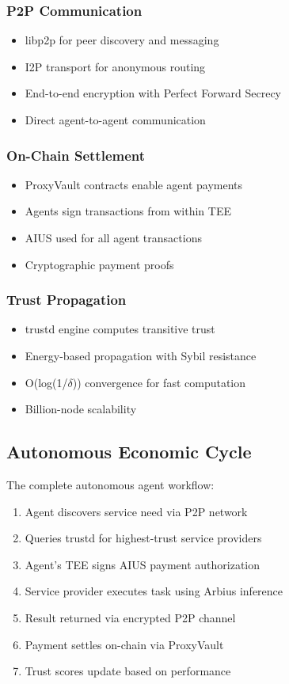 \documentclass{article}
\begin{document}
\subsubsection{P2P Communication}
\begin{itemize}
    \item libp2p for peer discovery and messaging
    \item I2P transport for anonymous routing
    \item End-to-end encryption with Perfect Forward Secrecy
    \item Direct agent-to-agent communication
\end{itemize}

\subsubsection{On-Chain Settlement}
\begin{itemize}
    \item ProxyVault contracts enable agent payments
    \item Agents sign transactions from within TEE
    \item AIUS used for all agent transactions
    \item Cryptographic payment proofs
\end{itemize}

\subsubsection{Trust Propagation}
\begin{itemize}
    \item trustd engine computes transitive trust
    \item Energy-based propagation with Sybil resistance
    \item O(log(1/$\delta$)) convergence for fast computation
    \item Billion-node scalability
\end{itemize}

\subsection{Autonomous Economic Cycle}

The complete autonomous agent workflow:

\begin{enumerate}
    \item Agent discovers service need via P2P network
    \item Queries trustd for highest-trust service providers
    \item Agent's TEE signs AIUS payment authorization
    \item Service provider executes task using Arbius inference
    \item Result returned via encrypted P2P channel
    \item Payment settles on-chain via ProxyVault
    \item Trust scores update based on performance
\end{enumerate}
\end{document}

